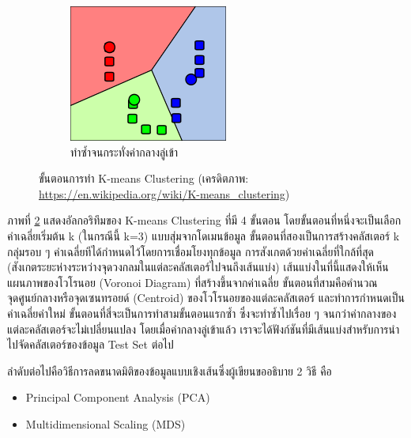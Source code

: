 \begin{figure}[H]
\begin{subfigure}{0.5\textwidth}
        \centering
        \includegraphics[width=0.9\linewidth]{fig/k-means-step4.png}
        \caption{ทำซ้ำจนกระทั่งค่ากลางลู่เข้า}
        \label{fig:k_means_step4}
    \end{subfigure}
    \caption{ขั้นตอนการทำ K-means Clustering (เครดิตภาพ: \url{https://en.wikipedia.org/wiki/K-means_clustering})}
    \label{fig:k_means}
\end{figure}
 
ภาพที่ \ref{fig:k_means} แสดงอัลกอริทึมของ K-means Clustering ที่มี 4 ขั้นตอน โดยขั้นตอนที่หนึ่งจะเป็นเลือกค่าเฉลี่ยเริ่มต้น k 
(ในกรณีนี้ k=3) แบบสุ่มจากโดเมนข้อมูล ขั้นตอนที่สองเป็นการสร้างคลัสเตอร์ k กลุ่มรอบ ๆ ค่าเฉลี่ยทีได้กำหนดไว้โดยการเชื่อมโยงทุกข้อมูล%
การสังเกตด้วยค่าเฉลี่ยที่ใกล้ที่สุด (สังเกตระยะห่างระหว่างจุดวงกลมในแต่ละคลัสเตอร์ไปจนถึงเส้นแบ่ง) เส้นแบ่งในที่นี้แสดงให้เห็นแผนภาพของโวโรนอย 
(Voronoi Diagram) ที่สร้างขึ้นจากค่าเฉลี่ย ขั้นตอนที่สามคือคำนวณจุดศูนย์กลางหรือจุดเซนทรอยด์ (Centroid) ของโวโรนอยของแต่ละคลัสเตอร์%
และทำการกำหนดเป็นค่าเฉลี่ยค่าใหม่ ขั้นตอนที่สี่จะเป็นการทำสามขั้นตอนแรกซ้ำ ซึ่งจะทำซ้ำไปเรื่อย ๆ จนกว่าค่ากลางของแต่ละคลัสเตอร์จะไม่เปลี่ยนแปลง
โดยเมื่อค่ากลางลู่เข้าแล้ว เราจะได้ฟังก์ชันที่มีเส้นแบ่งสำหรับการนำไปจัดคลัสเตอร์ของข้อมูล Test Set ต่อไป

ลำดับต่อไปคือวิธีการลดขนาดมิติของข้อมูลแบบเชิงเส้นซึ่งผู้เขียนขออธิบาย 2 วิธี คือ

\begin{itemize}
    \item Principal Component Analysis (PCA)
    
    \item Multidimensional Scaling (MDS)
\end{itemize}

